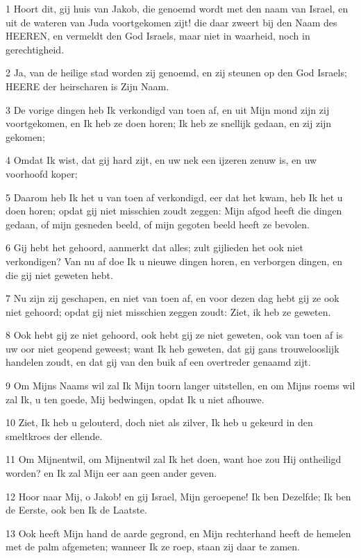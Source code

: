 \par 1 Hoort dit, gij huis van Jakob, die genoemd wordt met den naam van Israel, en uit de wateren van Juda voortgekomen zijt! die daar zweert bij den Naam des HEEREN, en vermeldt den God Israels, maar niet in waarheid, noch in gerechtigheid.
\par 2 Ja, van de heilige stad worden zij genoemd, en zij steunen op den God Israels; HEERE der heirscharen is Zijn Naam.
\par 3 De vorige dingen heb Ik verkondigd van toen af, en uit Mijn mond zijn zij voortgekomen, en Ik heb ze doen horen; Ik heb ze snellijk gedaan, en zij zijn gekomen;
\par 4 Omdat Ik wist, dat gij hard zijt, en uw nek een ijzeren zenuw is, en uw voorhoofd koper;
\par 5 Daarom heb Ik het u van toen af verkondigd, eer dat het kwam, heb Ik het u doen horen; opdat gij niet misschien zoudt zeggen: Mijn afgod heeft die dingen gedaan, of mijn gesneden beeld, of mijn gegoten beeld heeft ze bevolen.
\par 6 Gij hebt het gehoord, aanmerkt dat alles; zult gijlieden het ook niet verkondigen? Van nu af doe Ik u nieuwe dingen horen, en verborgen dingen, en die gij niet geweten hebt.
\par 7 Nu zijn zij geschapen, en niet van toen af, en voor dezen dag hebt gij ze ook niet gehoord; opdat gij niet misschien zeggen zoudt: Ziet, ik heb ze geweten.
\par 8 Ook hebt gij ze niet gehoord, ook hebt gij ze niet geweten, ook van toen af is uw oor niet geopend geweest; want Ik heb geweten, dat gij gans trouwelooslijk handelen zoudt, en dat gij van den buik af een overtreder genaamd zijt.
\par 9 Om Mijns Naams wil zal Ik Mijn toorn langer uitstellen, en om Mijns roems wil zal Ik, u ten goede, Mij bedwingen, opdat Ik u niet afhouwe.
\par 10 Ziet, Ik heb u gelouterd, doch niet als zilver, Ik heb u gekeurd in den smeltkroes der ellende.
\par 11 Om Mijnentwil, om Mijnentwil zal Ik het doen, want hoe zou Hij ontheiligd worden? en Ik zal Mijn eer aan geen ander geven.
\par 12 Hoor naar Mij, o Jakob! en gij Israel, Mijn geroepene! Ik ben Dezelfde; Ik ben de Eerste, ook ben Ik de Laatste.
\par 13 Ook heeft Mijn hand de aarde gegrond, en Mijn rechterhand heeft de hemelen met de palm afgemeten; wanneer Ik ze roep, staan zij daar te zamen.
